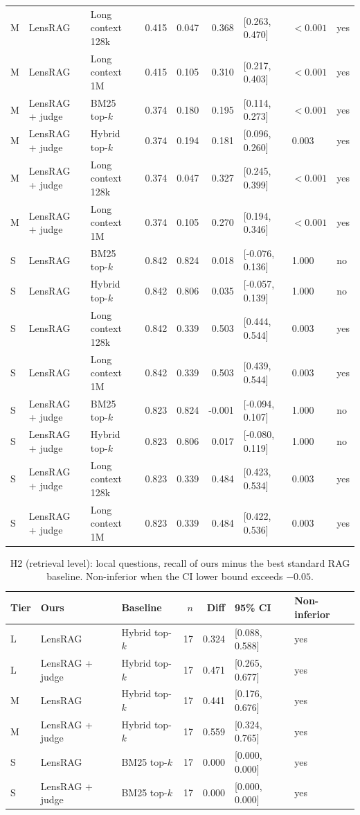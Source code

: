 \documentclass[11pt]{article}
\begin{document}
\begin{table}[htbp]
\begin{tabular}{lllrrrlll}
M & LensRAG & Long context 128k & 0.415 & 0.047 & 0.368 & [0.263, 0.470] & $<0.001$ & yes \\
M & LensRAG & Long context 1M & 0.415 & 0.105 & 0.310 & [0.217, 0.403] & $<0.001$ & yes \\
M & LensRAG + judge & BM25 top-$k$ & 0.374 & 0.180 & 0.195 & [0.114, 0.273] & $<0.001$ & yes \\
M & LensRAG + judge & Hybrid top-$k$ & 0.374 & 0.194 & 0.181 & [0.096, 0.260] & 0.003 & yes \\
M & LensRAG + judge & Long context 128k & 0.374 & 0.047 & 0.327 & [0.245, 0.399] & $<0.001$ & yes \\
M & LensRAG + judge & Long context 1M & 0.374 & 0.105 & 0.270 & [0.194, 0.346] & $<0.001$ & yes \\
S & LensRAG & BM25 top-$k$ & 0.842 & 0.824 & 0.018 & [-0.076, 0.136] & 1.000 & no \\
S & LensRAG & Hybrid top-$k$ & 0.842 & 0.806 & 0.035 & [-0.057, 0.139] & 1.000 & no \\
S & LensRAG & Long context 128k & 0.842 & 0.339 & 0.503 & [0.444, 0.544] & 0.003 & yes \\
S & LensRAG & Long context 1M & 0.842 & 0.339 & 0.503 & [0.439, 0.544] & 0.003 & yes \\
S & LensRAG + judge & BM25 top-$k$ & 0.823 & 0.824 & -0.001 & [-0.094, 0.107] & 1.000 & no \\
S & LensRAG + judge & Hybrid top-$k$ & 0.823 & 0.806 & 0.017 & [-0.080, 0.119] & 1.000 & no \\
S & LensRAG + judge & Long context 128k & 0.823 & 0.339 & 0.484 & [0.423, 0.534] & 0.003 & yes \\
S & LensRAG + judge & Long context 1M & 0.823 & 0.339 & 0.484 & [0.422, 0.536] & 0.003 & yes \\
\bottomrule
\end{tabular}
\end{table}

\begin{table}[htbp]
\centering\small
\caption{H2 (retrieval level): local questions, recall of ours minus the best standard RAG baseline. Non-inferior when the CI lower bound exceeds $-0.05$.}
\label{tab:h2local}
\begin{tabular}{lllrrll}
\toprule
Tier & Ours & Baseline & $n$ & Diff & 95\% CI & Non-inferior \\
\midrule
L & LensRAG & Hybrid top-$k$ & 17 & 0.324 & [0.088, 0.588] & yes \\
L & LensRAG + judge & Hybrid top-$k$ & 17 & 0.471 & [0.265, 0.677] & yes \\
M & LensRAG & Hybrid top-$k$ & 17 & 0.441 & [0.176, 0.676] & yes \\
M & LensRAG + judge & Hybrid top-$k$ & 17 & 0.559 & [0.324, 0.765] & yes \\
S & LensRAG & BM25 top-$k$ & 17 & 0.000 & [0.000, 0.000] & yes \\
S & LensRAG + judge & BM25 top-$k$ & 17 & 0.000 & [0.000, 0.000] & yes \\
\bottomrule
\end{tabular}
\end{table}
\end{document}
